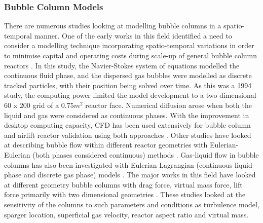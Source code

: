 \subsubsection{Bubble Column Models}
There are numerous studies looking at modelling bubble columns in a spatio-temporal manner. One of the early works in this field identified a need to consider a modelling technique incorporating spatio-temporal variations in order to minimise capital and operating costs during scale-up of general bubble column reactors \cite{Lapin1994}. In this study, the Navier-Stokes system of equations modelled the continuous fluid phase, and the dispersed gas bubbles were modelled as discrete tracked particles, with their position being solved over time. As this was a 1994 study, the computing power limited the model development to a two dimensional 60 x 200 grid of a $0.75 m^{2}$ reactor face. Numerical diffusion arose when both the liquid and gas were considered as continuous phases. With the improvement in desktop computing capacity, CFD has been used extensively for bubble column and airlift reactor validation using both approaches \cite{Bitog2011}. Other studies have looked at describing bubble flow within different reactor geometries with Eulerian-Eulerian (both phases considered continuous) methods \cite{Lehr2002, Pfleger2001, Buwa2002, Pareek2003, Ekambara2005, Sokolichin1999}. Gas-liquid flow in bubble columns has also been investigated with Eulerian-Lagrangian (continuous liquid phase and discrete gas phase) models \cite{Zhang2013a}. The major works in this field have looked at different geometry bubble columns with drag force, virtual mass force, lift force primarily with two dimensional geometries \cite{Buwa2006, Goz2004a, Luo2011, Ekambara2005, Lan2002, Mouza2004}. These studies looked at the sensitivity of the columns to such parameters and conditions as turbulence model, sparger location, superficial gas velocity, reactor aspect ratio and virtual mass. \\

